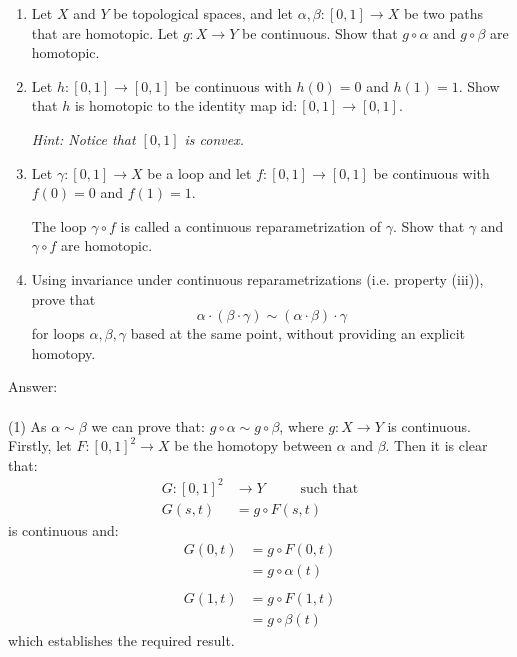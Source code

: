 \documentclass[12pt]{article}
\begin{document}
\begin{enumerate}
\item[(i)] Let $X$ and $Y$ be topological spaces,
and let $\alpha,\beta:[0,1]\to X$ be two paths
that are homotopic. Let $g:X\to Y$ be continuous.
Show that $g\circ\alpha$ and $g\circ\beta$
are homotopic.

\item[(ii)] Let $h:[0,1]\to[0,1]$ be continuous
with $h(0)=0$ and $h(1)=1$.
Show that $h$ is homotopic to the identity map
$\mathrm{id}:[0,1]\to[0,1]$.

\noindent\textit{Hint: Notice that $[0,1]$ is convex.}

\item[(iii)] Let $\gamma:[0,1]\to X$ be a loop
and let $f:[0,1]\to[0,1]$ be continuous with
$f(0)=0$ and $f(1)=1$.

The loop $\gamma\circ f$ is called a continuous
reparametrization of $\gamma$.
Show that $\gamma$ and $\gamma\circ f$
are homotopic.

\item[(iv)] Using invariance under continuous
reparametrizations (i.e. property (iii)),
prove that
\[
\alpha\cdot(\beta\cdot\gamma)
\sim
(\alpha\cdot\beta)\cdot\gamma
\]
for loops $\alpha,\beta,\gamma$ based at the
same point, without providing an explicit
homotopy.
\end{enumerate}

\vspace{1cm}
\noindent
Answer:\\
\\
(1) As $\alpha \sim \beta$ we can prove that: $g \circ \alpha \sim g \circ \beta$, where $g:X \to Y$ is continuous.\\
Firstly, let $F:[0,1]^2 \to X$ be the homotopy between $\alpha$ and $\beta$.  Then it is clear that:
\begin{align*}
    G: [0,1]^2 &\to Y \;\;\;\;\;\;\;\; \text{ such that} \\
    G(s,t) &= g \circ F(s,t)
\end{align*}
is continuous and:
\begin{align*}
    G(0,t) &= g \circ F(0,t) \\
    &= g \circ \alpha(t) \\
    \\
    G(1,t) &= g \circ F(1,t) \\
    &= g \circ \beta(t)
\end{align*}
which establishes the required result. \\
\end{document}
